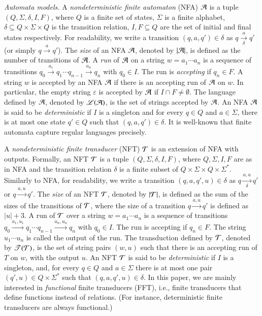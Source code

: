 \smallskip
\noindent \emph{Automata models.} 
A \emph{nondeterministic finite automaton} (NFA) $\mathcal{A}$ is a tuple $(Q, \Sigma, \delta, I, F)$, where $Q$ is a finite set of states, $\Sigma$ is a finite alphabet, $\delta \subseteq Q \times \Sigma \times Q$ is the transition relation, $I,F \subseteq Q$ are the set of initial and final states respectively. For readability, we write a transition $(q, a, q') \in \delta$ as $q \xrightarrow[\delta]{a} q'$ (or simply $q \xrightarrow{a} q'$). %
The \emph{size} of an NFA $\mathcal{A}$, denoted by $|\mathcal{A}|$, is defined as the number of transitions of $\mathcal{A}$.
%
A \emph{run} of $\mathcal{A}$ on a string $w = a_1 \cdots a_n$ is a sequence of transitions $q_0 \xrightarrow{a_1} q_1 \cdots q_{n-1} \xrightarrow{a_n} q_n$ with $q_0 \in I$. The run is \emph{accepting} if $q_n \in F$.
A string $w$ is accepted by an NFA $\mathcal{A}$ if there is an accepting run of $\mathcal{A}$ on $w$. In particular, the empty string $\varepsilon$ is accepted by $\mathcal{A}$ if $I \cap F \neq \emptyset$. The language defined by $\mathcal{A}$, denoted by $\mathscr{L}(\mathcal{A})$, is the set of strings accepted by $\mathcal{A}$. 
%
An NFA $\mathcal{A}$ is said to be \emph{deterministic} if $I$ is a singleton and for every $q \in Q$ and $a \in \Sigma$, there is at most one state $q' \in Q$ such that $(q, a, q') \in \delta$.
%
It is well-known that finite automata capture regular languages precisely. 


A \emph{nondeterministic finite transducer} (NFT) $\mathcal{T}$ is an extension of NFA with outputs. Formally, an NFT $\mathcal{T}$ is a tuple $(Q, \Sigma, \delta, I, F)$, where $Q, \Sigma, I, F$ are as in NFA and the transition relation $\delta$ is a finite subset of $Q \times \Sigma \times Q \times \Sigma^*$. Similarly to NFA, for readability, we write a transition $(q, a, q', u) \in \delta$ as $q \xrightarrow[\delta]{a, u} q'$ or $q \xrightarrow{a, u} q'$. The \emph{size} of an NFT $\mathcal{T}$, denoted by $|\mathcal{T}|$, is defined as the sum of the sizes of the transitions of $\mathcal{T}$, where the size of a transition $q \xrightarrow{a, u} q'$ is defined as $|u|+3$.
%
A run of $\mathcal{T}$ over a string $w=a_1 \cdots a_n$ is a sequence of transitions $q_0 \xrightarrow{a_1, u_1} q_1 \cdots q_{n-1} \xrightarrow{a_n, u_n} q_n$ with $q_0 \in I$. The run is accepting if $q_n \in F$. The string $u_1 \cdots u_n$ is called the output of the run. The transduction defined by $\mathcal{T}$, denoted by $\mathscr{T}(\mathcal{T})$, is the set of string pairs $(w, u)$ such that there is an accepting run of $T$ on $w$, with the output $u$. An NFT $\mathcal{T}$ is said to be \emph{deterministic} if $I$ is a singleton, and, for every $q \in Q$ and $a \in \Sigma$  there is at most one pair $(q', u) \in Q \times \Sigma^*$ such that $(q, a, q', u) \in \delta$.
%
In this paper, we are mainly interested in \emph{functional} finite transducers (FFT), i.e., finite transducers that define functions instead of relations. (For instance, deterministic finite transducers are always functional.)

